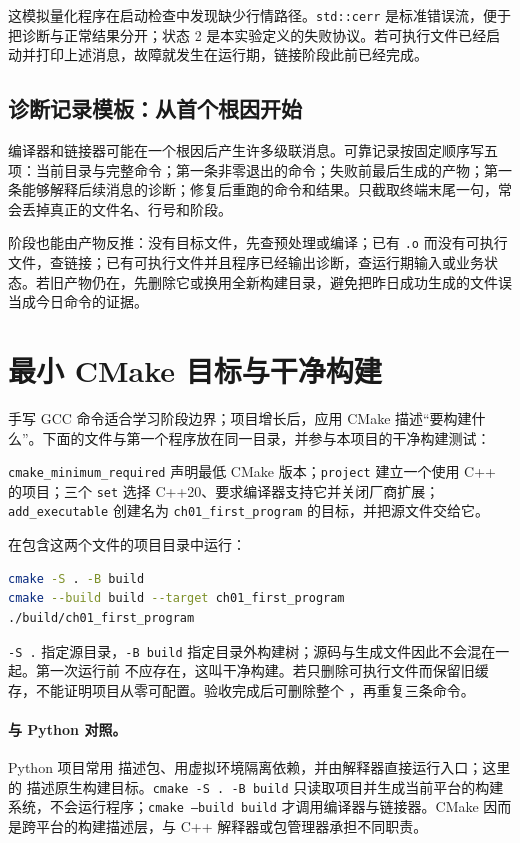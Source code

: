这模拟量化程序在启动检查中发现缺少行情路径。\texttt{std::cerr} 是标准错误流，便于把诊断与正常结果分开；状态 2 是本实验定义的失败协议。若可执行文件已经启动并打印上述消息，故障就发生在运行期，链接阶段此前已经完成。

\subsection{诊断记录模板：从首个根因开始}

编译器和链接器可能在一个根因后产生许多级联消息。可靠记录按固定顺序写五项：当前目录与完整命令；第一条非零退出的命令；失败前最后生成的产物；第一条能够解释后续消息的诊断；修复后重跑的命令和结果。只截取终端末尾一句，常会丢掉真正的文件名、行号和阶段。

阶段也能由产物反推：没有目标文件，先查预处理或编译；已有 \texttt{.o} 而没有可执行文件，查链接；已有可执行文件并且程序已经输出诊断，查运行期输入或业务状态。若旧产物仍在，先删除它或换用全新构建目录，避免把昨日成功生成的文件误当成今日命令的证据。

\section{最小 CMake 目标与干净构建}

手写 GCC 命令适合学习阶段边界；项目增长后，应用 CMake 描述“要构建什么”。下面的文件与第一个程序放在同一目录，并参与本项目的干净构建测试：



\texttt{cmake\_minimum\_required} 声明最低 CMake 版本；\texttt{project} 建立一个使用 C++ 的项目；三个 \texttt{set} 选择 C++20、要求编译器支持它并关闭厂商扩展；\texttt{add\_executable} 创建名为 \texttt{ch01\_first\_program} 的目标，并把源文件交给它。

在包含这两个文件的项目目录中运行：

\begin{lstlisting}[language=bash,numbers=none]
cmake -S . -B build
cmake --build build --target ch01_first_program
./build/ch01_first_program
\end{lstlisting}

\texttt{-S .} 指定源目录，\texttt{-B build} 指定目录外构建树；源码与生成文件因此不会混在一起。第一次运行前  不应存在，这叫干净构建。若只删除可执行文件而保留旧缓存，不能证明项目从零可配置。验收完成后可删除整个 ，再重复三条命令。

\paragraph{与 Python 对照。}
Python 项目常用  描述包、用虚拟环境隔离依赖，并由解释器直接运行入口；这里的  描述原生构建目标。\texttt{cmake -S . -B build} 只读取项目并生成当前平台的构建系统，不会运行程序；\texttt{cmake --build build} 才调用编译器与链接器。CMake 因而是跨平台的构建描述层，与 C++ 解释器或包管理器承担不同职责。

